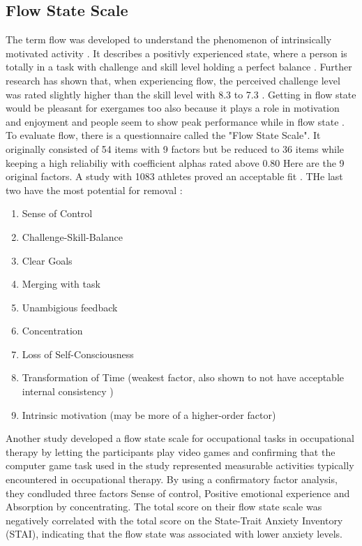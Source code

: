 \subsection{Flow State Scale}
The term flow was developed to understand the phenomenon of intrinsically motivated activity \cite{nakamura02concept}. It describes a positivly experienced state, where a person is totally in a task with challenge and skill level holding a perfect balance \cite{jackson1998psychological}. Further research has shown that, when experiencing flow, the perceived challenge level was rated slightly higher than the skill level with 8.3 to 7.3 \cite{jackson1996development}. Getting in flow state would be pleasant for exergames too also because it plays a role in motivation and enjoyment and people seem to show peak performance while in flow state \cite{jackson1996development, harris20review}.
To evaluate flow, there is a questionnaire called the "Flow State Scale". It originally consisted of 54 items with 9 factors but be reduced to 36 items while keeping a high reliabiliy with coefficient alphas rated above 0.80 \cite{jackson1996development} 
Here are the 9 original factors. A study with 1083 athletes proved an acceptable fit \cite{stavrou11confirmatory}. THe last two have the most potential for removal \cite{jackson1996development}:
\begin{enumerate}
	\item Sense of Control
	\item Challenge-Skill-Balance
	\item Clear Goals
	\item Merging with task
	\item Unambigious feedback
	\item Concentration
	\item Loss of Self-Consciousness
	\item Transformation of Time (weakest factor, also shown to not have acceptable internal consistency \cite{vlachopoulus00confirmatory})
	\item Intrinsic motivation (may be more of a higher-order factor)
\end{enumerate}

Another study developed a flow state scale for occupational tasks in occupational therapy by letting the participants play video games and confirming that the computer game task used in the study represented measurable activities typically encountered in occupational therapy. By using a confirmatory factor analysis, they condluded three factors Sense of control, Positive emotional experience and Absorption by concentrating.
The total score on their flow state scale was negatively correlated with the total score on the State-Trait Anxiety Inventory (STAI), indicating that the flow state was associated with lower anxiety levels.

